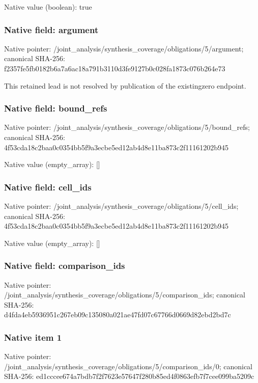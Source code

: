 \documentclass[10pt,a4paper]{article}
\begin{document}
Native value (boolean): true

\subsubsection{Native field: argument}
Native pointer: /joint\_\allowbreak{}analysis/synthesis\_\allowbreak{}coverage/obligations/5/argument; canonical SHA-256: f2357fe5fb0182b6a7a6ac18a791b3110d3fe9127b0c028fa1873c076b264e73

\begingroup\raggedright\sloppy This retained lead is not resolved by publication of the existingzero endpoint.\par\endgroup

\subsubsection{Native field: bound\_\allowbreak{}refs}
Native pointer: /joint\_\allowbreak{}analysis/synthesis\_\allowbreak{}coverage/obligations/5/bound\_\allowbreak{}refs; canonical SHA-256: 4f53cda18c2baa0c0354bb5f9a3ecbe5ed12ab4d8e11ba873c2f11161202b945

Native value (empty\_\allowbreak{}array): []

\subsubsection{Native field: cell\_\allowbreak{}ids}
Native pointer: /joint\_\allowbreak{}analysis/synthesis\_\allowbreak{}coverage/obligations/5/cell\_\allowbreak{}ids; canonical SHA-256: 4f53cda18c2baa0c0354bb5f9a3ecbe5ed12ab4d8e11ba873c2f11161202b945

Native value (empty\_\allowbreak{}array): []

\subsubsection{Native field: comparison\_\allowbreak{}ids}
Native pointer: /joint\_\allowbreak{}analysis/synthesis\_\allowbreak{}coverage/obligations/5/comparison\_\allowbreak{}ids; canonical SHA-256: d4fda4eb5936951c267eb09c135080a021ae47fd07c67766d0669d82ebd2bd7c

\subsubsection{Native item 1}
Native pointer: /joint\_\allowbreak{}analysis/synthesis\_\allowbreak{}coverage/obligations/5/comparison\_\allowbreak{}ids/0; canonical SHA-256: ed1cccee674a7bdb7f2f7623e57647f280b85ed4f0863efb7f7cee099ba5209c
\end{document}

